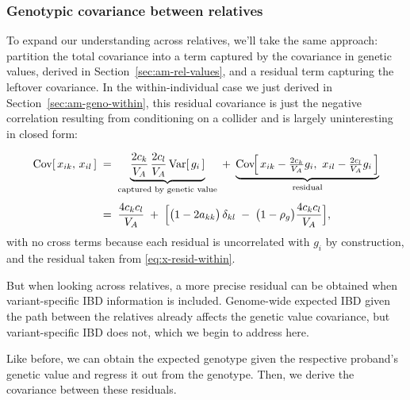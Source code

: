 \documentclass[12pt]{article}
\begin{document}
\subsubsection{Genotypic covariance between relatives}\label{sec:am-geno-rel}
To expand our understanding across relatives, we'll take the same approach: partition the total covariance into a term captured by the covariance in genetic values, derived in Section~\ref{sec:am-rel-values}, and a residual term capturing the leftover covariance.
In the within-individual case we just derived in Section~\ref{sec:am-geno-within}, this residual covariance is just the negative correlation resulting from conditioning on a collider and is largely uninteresting in closed form:

\begin{equation}\label{eq:x-within-split}
\begin{aligned}
    \Cov[\,x_{ik},\, x_{il}\,]
    \;&=\; \underbrace{\frac{2c_k}{V_A}\,\frac{2c_l}{V_A}\,\Var[\,g_i\,]}_{\text{captured by genetic value}}
    \;+\; \underbrace{\Cov\!\Big[\,x_{ik} - \tfrac{2c_k}{V_A} g_i,\ x_{il} - \tfrac{2c_l}{V_A} g_i\,\Big]}_{\text{residual}} \\[4pt]
    \;&=\; \frac{4c_k c_l}{V_A} \;+\; \Big[\big(1 - 2a_{kk}\big)\,\delta_{kl} \;-\; \big(1-\rho_g\big)\frac{4c_k c_l}{V_A}\Big] ,
\end{aligned}
\end{equation}
with no cross terms because each residual is uncorrelated with $g_i$ by construction, and the residual taken from \eqref{eq:x-resid-within}.

But when looking across relatives, a more precise residual can be obtained when variant-specific IBD information is included.
Genome-wide expected IBD given the path between the relatives already affects the genetic value covariance, but variant-specific IBD does not, which we begin to address here.

Like before, we can obtain the expected genotype given the respective proband's genetic value and regress it out from the genotype.
Then, we derive the covariance between these residuals.


\end{document}
